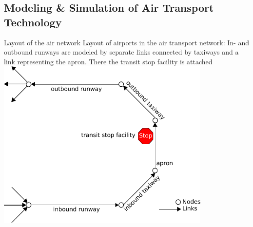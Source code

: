 \subsection{Modeling \& Simulation of Air Transport Technology}
\label{sec:modeling-of-technology}
%
%
%
\createfigure%
{Layout of the air network}%
{Layout of airports in the air transport network: In- and outbound runways are modeled by separate links connected by taxiways and a link representing the apron. There the transit stop facility is attached}%
{\label{fig:air_airport}}%
{\includegraphics[width=0.8\textwidth]{extending/figures/air/sf_flight_model_airport.pdf}}%
